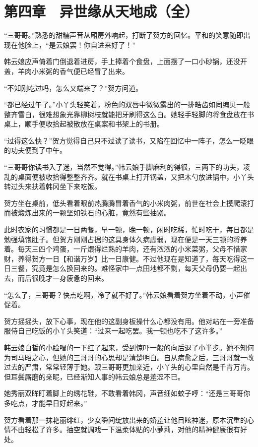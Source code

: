 \section{第四章　异世缘从天地成（全）}

“三哥哥。”熟悉的甜糯声音从厢房外响起，打断了贺方的回忆。平和的笑意随即出现在他脸上，“是云娘罢！你自进来好了！”

韩云娘应声倚着门倒退着进房，手上捧着个食盘，上面摆了一口小砂锅，还没开盖，羊肉小米粥的香气便已经冒了出来。

“不知刚吃过吗，怎么又端来了？”贺方问道。

“都已经过午了。”小丫头轻笑着，粉色的双唇中微微露出的一排皓齿如同编贝一般整齐雪白，很难想象光靠柳树枝就能把牙刷得这么白。她轻手轻脚的将食盘放在书桌上，顺手便收拾起被散放在桌案和书架上的书册。

“过得这么快？”贺方觉得自己只不过读了读书，又陷在回忆中一阵子，怎么一眨眼的功夫便到了中午。

“三哥哥你读书入了迷，当然不觉得。”韩云娘手脚麻利的得很，三两下的功夫，凌乱的桌面便被收拾得整整齐齐。就在书桌上打开锅盖，又把木勺放进锅中，小丫头转过头来扶着韩冈坐下来吃饭。

贺方坐在桌前，低头看着眼前热腾腾冒着香气的小米肉粥，前世在社会上摸爬滚打而被煅炼出来的一颗坚如铁石的心脏，竟然有些抽紧。

此时农家的习惯都是一日两餐，早一顿，晚一顿，闲时吃稀，忙时吃干，每日都是勉强填饱肚子。但贺方刚刚占据的这具身体久病虚弱，现在便是一天三顿的将养着。每天三四个鸡蛋，一斤煨得烂熟的羊肉，还有浓浓的小米菜粥，父母不惜家财，养得贺方一日【和谐万岁】比一日康健。不过他现在是知道了，每天吃得这一日三餐，究竟是怎么换回来的。难怪家中一点田地都不剩，每天父母仍要一起出去，而后很晚才一身疲惫的回来。

“怎么了，三哥哥？快点吃啊，冷了就不好了。”韩云娘看着贺方坐着不动，小声催促着。

贺方摇摇头，放下心事，现在他的这副身板操什么心都没有用。他对站在一旁准备服侍自己吃饭的小丫头笑道：“过来一起吃罢。我一顿也吃不了这许多。”

韩云娘白皙的小脸噌的一下红了起来，受到惊吓一般的向后退了小半步。她不知何为司马昭之心，但她的三哥哥的心思却是清楚明白。自从病愈之后，三哥哥就一改过去的严肃，常常轻薄于她。跟三哥哥更加亲近，小丫头的心里自然是千肯万肯。但耳鬓厮磨的亲昵，已经渐知人事的韩云娘总是羞涩不已。

她秀丽双眸盯着脚上的绣花鞋，不敢看着韩冈，声音细如蚊子哼：“还是三哥哥你多吃点，才能早日好起来。”

贺方看着那一抹艳丽绯红，少女瞬间绽放出来的娇羞让他目眩神迷，原本沉重的心情不由轻松了许多。抽空就调戏一下温柔体贴的小萝莉，对他的精神健康很有好处。

